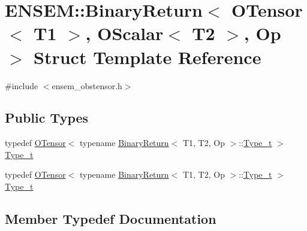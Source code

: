 \hypertarget{structENSEM_1_1BinaryReturn_3_01OTensor_3_01T1_01_4_00_01OScalar_3_01T2_01_4_00_01Op_01_4}{}\section{E\+N\+S\+EM\+:\+:Binary\+Return$<$ O\+Tensor$<$ T1 $>$, O\+Scalar$<$ T2 $>$, Op $>$ Struct Template Reference}
\label{structENSEM_1_1BinaryReturn_3_01OTensor_3_01T1_01_4_00_01OScalar_3_01T2_01_4_00_01Op_01_4}


{\ttfamily \#include $<$ensem\+\_\+obstensor.\+h$>$}

\subsection*{Public Types}
\begin{DoxyCompactItemize}
\item 
typedef \mbox{\hyperlink{classENSEM_1_1OTensor}{O\+Tensor}}$<$ typename \mbox{\hyperlink{structENSEM_1_1BinaryReturn}{Binary\+Return}}$<$ T1, T2, Op $>$\+::\mbox{\hyperlink{structENSEM_1_1BinaryReturn_3_01OTensor_3_01T1_01_4_00_01OScalar_3_01T2_01_4_00_01Op_01_4_a555600e8b3228e054f9ca8d560b36469}{Type\+\_\+t}} $>$ \mbox{\hyperlink{structENSEM_1_1BinaryReturn_3_01OTensor_3_01T1_01_4_00_01OScalar_3_01T2_01_4_00_01Op_01_4_a555600e8b3228e054f9ca8d560b36469}{Type\+\_\+t}}
\item 
typedef \mbox{\hyperlink{classENSEM_1_1OTensor}{O\+Tensor}}$<$ typename \mbox{\hyperlink{structENSEM_1_1BinaryReturn}{Binary\+Return}}$<$ T1, T2, Op $>$\+::\mbox{\hyperlink{structENSEM_1_1BinaryReturn_3_01OTensor_3_01T1_01_4_00_01OScalar_3_01T2_01_4_00_01Op_01_4_a555600e8b3228e054f9ca8d560b36469}{Type\+\_\+t}} $>$ \mbox{\hyperlink{structENSEM_1_1BinaryReturn_3_01OTensor_3_01T1_01_4_00_01OScalar_3_01T2_01_4_00_01Op_01_4_a555600e8b3228e054f9ca8d560b36469}{Type\+\_\+t}}
\end{DoxyCompactItemize}


\subsection{Member Typedef Documentation}
\mbox{\label{structENSEM_1_1BinaryReturn_3_01OTensor_3_01T1_01_4_00_01OScalar_3_01T2_01_4_00_01Op_01_4_a555600e8b3228e054f9ca8d560b36469}} 
